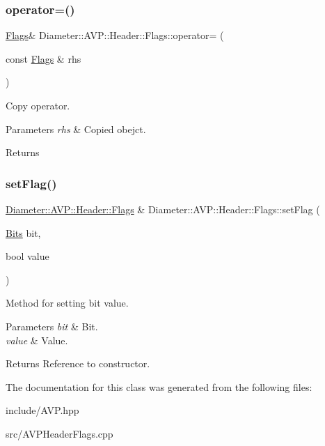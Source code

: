 \subsubsection{\texorpdfstring{operator=()}{operator=()}\hspace{0.1cm}{\footnotesize\ttfamily [2/2]}}
{\footnotesize\ttfamily \hyperlink{classDiameter_1_1AVP_1_1Header_1_1Flags}{Flags}\& Diameter\+::\+A\+V\+P\+::\+Header\+::\+Flags\+::operator= (\begin{DoxyParamCaption}\item[{const \hyperlink{classDiameter_1_1AVP_1_1Header_1_1Flags}{Flags} \&}]{rhs }\end{DoxyParamCaption})\hspace{0.3cm}{\ttfamily [default]}}



Copy operator. 


\begin{DoxyParams}{Parameters}
{\em rhs} & Copied obejct. \\
\hline
\end{DoxyParams}
\begin{DoxyReturn}{Returns}

\end{DoxyReturn}
\mbox{\label{classDiameter_1_1AVP_1_1Header_1_1Flags_a4ba216d20eac1f0cab1573b6b354d33c}} 
\subsubsection{\texorpdfstring{set\+Flag()}{setFlag()}}
{\footnotesize\ttfamily \hyperlink{classDiameter_1_1AVP_1_1Header_1_1Flags}{Diameter\+::\+A\+V\+P\+::\+Header\+::\+Flags} \& Diameter\+::\+A\+V\+P\+::\+Header\+::\+Flags\+::set\+Flag (\begin{DoxyParamCaption}\item[{\hyperlink{classDiameter_1_1AVP_1_1Header_1_1Flags_af24fa00d6135e01a5b58c9ae84245262}{Bits}}]{bit,  }\item[{bool}]{value }\end{DoxyParamCaption})}



Method for setting bit value. 


\begin{DoxyParams}{Parameters}
{\em bit} & Bit. \\
\hline
{\em value} & Value. \\
\hline
\end{DoxyParams}
\begin{DoxyReturn}{Returns}
Reference to constructor. 
\end{DoxyReturn}


The documentation for this class was generated from the following files\+:\begin{DoxyCompactItemize}
\item 
include/A\+V\+P.\+hpp\item 
src/A\+V\+P\+Header\+Flags.\+cpp\end{DoxyCompactItemize}
